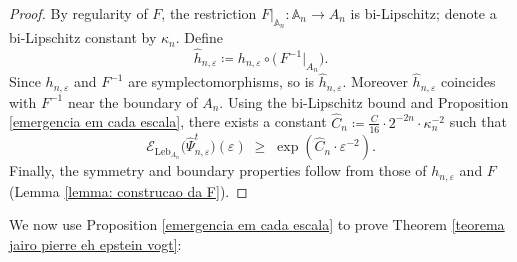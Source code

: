 \documentclass[11pt,reqno]{amsart}
\theoremstyle{plain}
\theoremstyle{definition}
\theoremstyle{remark}
\theoremstyle{plain}
\numberwithin{equation}{section}
\newcommand{\eps}{\varepsilon}
\begin{document}
\begin{proof}

By regularity of $F$, the restriction
$F|_{\mathbb A_n}\colon \mathbb A_n\to A_n$
is bi-Lipschitz; denote a bi-Lipschitz constant by $\kappa_n$. Define
\[
\widehat h_{n,\eps}\coloneqq h_{n,\eps}\circ \big(\,F^{-1}\big|_{A_n}\big).
\]
Since $h_{n,\eps}$ and $F^{-1}$ are symplectomorphisms, so is $\widehat h_{n,\eps}$. Moreover $\widehat h_{n,\eps}$ coincides with $F^{-1}$ near the boundary of $A_n$. Using the bi-Lipschitz bound and Proposition \ref{emergencia em cada escala}, there exists a constant $\widehat C_n \coloneqq \frac{C}{16}\cdot2^{-2n}\cdot  \kappa_n^{-2}$ such that 
\[
\mathcal{E}_{\mathrm{Leb}_{A_n}}\big(\widehat\Psi^t_{n,\eps}\big)(\eps)
\;\ge\; \exp\!\left(\widehat C_n\cdot\eps^{-2}\right).
\]
Finally, the symmetry and boundary properties follow from those of $h_{n,\eps}$ and $F$ (Lemma \ref{lemma: construcao da F}).
\end{proof}


	
	
	We now use Proposition \ref{emergencia em cada escala} to prove Theorem \ref{teorema jairo pierre eh epstein vogt}:
	
\end{document}
